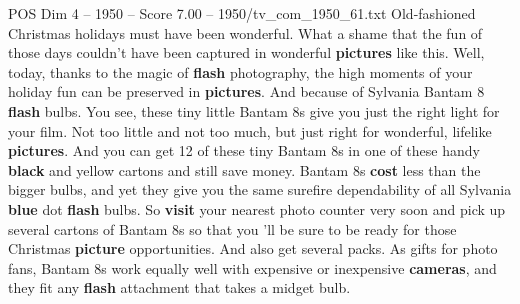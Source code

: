 \begin{textsample}{POS Dim 4 – 1950 – Score 7.00 – 1950/tv\_com\_1950\_61.txt}  \label{ex:f4_pos_082}
Old-fashioned Christmas holidays must have been wonderful.
What a shame that the fun of those days couldn't have been captured in wonderful \textbf{pictures} like this.
Well, today, thanks to the magic of \textbf{flash} photography, the high moments of your holiday fun can be preserved in \textbf{pictures}.
And because of Sylvania Bantam 8 \textbf{flash} bulbs.
You see, these tiny little Bantam 8s give you just the right light for your film.
Not too little and not too much, but just right for wonderful, lifelike \textbf{pictures}.
And you can get 12 of these tiny Bantam 8s in one of these handy \textbf{black} and yellow cartons and still save money.
Bantam 8s \textbf{cost} less than the bigger bulbs, and yet they give you the same surefire dependability of all Sylvania \textbf{blue} dot \textbf{flash} bulbs.
So \textbf{visit} your nearest photo counter very soon and pick up several cartons of Bantam 8s so that you 'll be sure to be ready for those Christmas \textbf{picture} opportunities.
And also get several packs.
As gifts for photo fans, Bantam 8s work equally well with expensive or inexpensive \textbf{cameras}, and they fit any \textbf{flash} attachment that takes a midget bulb.

\end{textsample}
